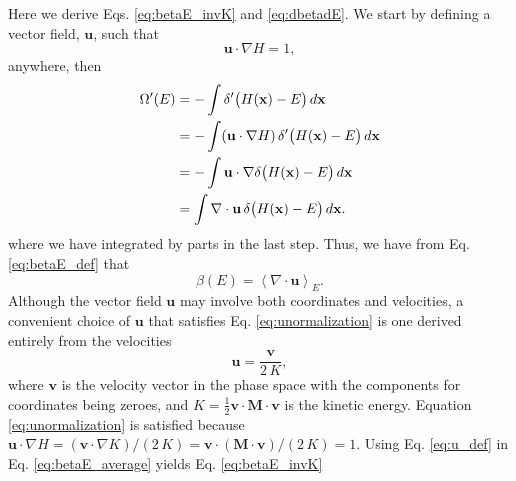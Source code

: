 \documentclass[reprint]{revtex4-1}
\begin{document}
Here we derive Eqs. \eqref{eq:betaE_invK} and \eqref{eq:dbetadE}.
We start by defining a vector field, $\mathbf u$,
such that
%
\begin{equation}
  \mathbf u \cdot \nabla H = 1
  ,
  \label{eq:unormalization}
\end{equation}
%
anywhere, then
%
\begin{align}
  \Omega'(E)
  &= -\int \delta'\bigl( H(\mathbf x) - E \bigr) \, d\mathbf x
     \notag \\
  &= -\int (\mathbf u \cdot \nabla H) \,
           \delta'\bigl( H(\mathbf x) - E \bigr) \, d\mathbf x
     \notag \\
  &= -\int \mathbf u \cdot
           \nabla \delta\bigl( H(\mathbf x) - E \bigr) \, d\mathbf x
     \notag \\
  &= \int \nabla \cdot \mathbf u \,
     \delta\bigl( H(\mathbf x) - E \bigr) \, d\mathbf x
  .
  \notag
\end{align}
%
where we have integrated by parts in the last step.
%
Thus, we have from Eq. \eqref{eq:betaE_def} that
%
\begin{equation}
  \beta(E)
  =
  \left\langle
    \nabla \cdot \mathbf u
  \right\rangle_E
  .
  \label{eq:betaE_average}
\end{equation}
%
Although the vector field $\mathbf u$ may involve both coordinates and velocities,
a convenient choice of $\mathbf u$ that satisfies
Eq. \eqref{eq:unormalization}
is one derived entirely from the velocities
%
\begin{equation}
  \mathbf u
  =
  \frac{ \mathbf v }
       {  2 \, K }
  ,
  \label{eq:u_def}
\end{equation}
where $\mathbf v$ is the velocity vector in the phase space
with the components for coordinates being zeroes,
and $K = \frac 1 2 \mathbf v \cdot \mathbf M \cdot \mathbf v$
is the kinetic energy.
%
Equation \eqref{eq:unormalization} is satisfied
because
$\mathbf u \cdot \nabla H
= (\mathbf v \cdot \nabla K)/(2 \, K)
= \mathbf v \cdot (\mathbf M \cdot \mathbf v) / (2 \, K) = 1$.
%
Using Eq. \eqref{eq:u_def} in Eq. \eqref{eq:betaE_average} yields Eq. \eqref{eq:betaE_invK}
\end{document}
